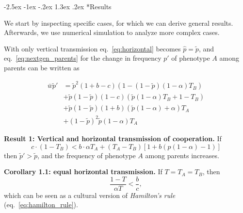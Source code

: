 \documentclass[12pt]{extarticle}
\makeatletter
\renewcommand\section{\@startsection {section}{1}{\z@}%
     {-2.5ex \@plus -1ex \@minus -.2ex}%
     {1.3ex \@plus.2ex}%
    {\Large\bfseries}}
\makeatother
\begin{document}
\section*{Results}

We start by inspecting specific cases, for which we can derive general results. 
Afterwards, we use numerical simulation to analyze more complex cases.

With only vertical transmission eq.~\ref{eq:horizontal} becomes
$\hat{p} =  \tilde{p}$,
and eq.~\ref{eq:nextgen_parents} for the change in frequency $p'$ of phenotype $A$ among parents can be written as

\begin{equation} 
\begin{split}\label{eq:nextgen_parents_vertical_only}
\bar{w} \tilde{p}' 
& = \tilde{p}^2 (1+b-c) (1 - (1-\tilde{p}) (1-\alpha) T_B) \\
& + \tilde{p}(1-\tilde{p}) (1-c) (\tilde{p} (1-\alpha) T_B + 1 - T_B) \\
& + \tilde{p}(1-\tilde{p}) (1+b) (\tilde{p} (1-\alpha) + \alpha) T_A \\
& + (1-\tilde{p})^2 \tilde{p} (1-\alpha) T_A
\end{split}
\end{equation}

\textbf{Result 1: Vertical and horizontal transmission of cooperation.}
If 
\begin{equation}\label{eq:unequal_transmission}
c \cdot (1-T_B) < b \cdot  \alpha T_A  + (T_A - T_B) [1 + b (p(1-\alpha) - 1)]
\end{equation}
then $\tilde{p}' > \tilde{p}$, and the frequency of phenotype $A$ among parents increases. 

\textbf{Corollary 1.1: equal horizontal transmission.}
If $T=T_A=T_B$, then
\begin{equation}
\label{eq:equal_transmission}
\frac{1-T}{\alpha T} < \frac{b}{c},
\end{equation}
which can be seen as a cultural version of \emph{Hamilton's rule} (eq.~\ref{eq:hamilton_rule}).

	
\end{document}
